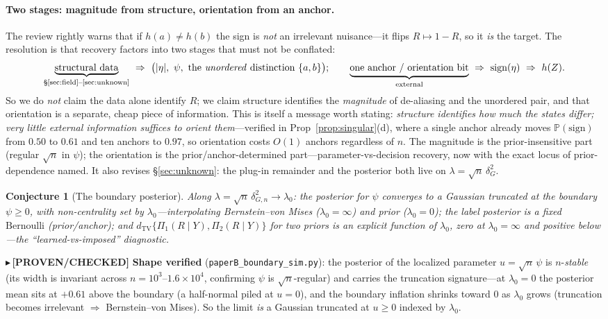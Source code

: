 \documentclass[11pt]{article}
\newtheorem{conjecture}{Conjecture}
\newcommand{\PROVEN}[1]{{\color{teal}\small$\blacktriangleright$\,\textbf{[PROVEN/CHECKED]} #1}}
\renewcommand{\Pr}{\mathbb{P}}\newcommand{\I}{\mathbb{I}}\newcommand{\HH}{\mathbb{H}}
\begin{document}
\paragraph{Two stages: magnitude from structure, orientation from an anchor.} The review rightly warns that if
$h(a)\neq h(b)$ the sign is \emph{not} an irrelevant nuisance---it flips $R\mapsto1-R$, so it \emph{is} the
target. The resolution is that recovery factors into two stages that must not be conflated:
\[
   \underbrace{\text{structural data}}_{\text{§\ref{sec:field}--\ref{sec:unknown}}}\ \Rightarrow\
   \big(|\eta|,\ \psi,\ \text{the \emph{unordered} distinction }\{a,b\}\big);\qquad
   \underbrace{\text{one anchor / orientation bit}}_{\text{external}}\ \Rightarrow\ \mathrm{sign}(\eta)\ \Rightarrow\ h(Z).
\]
So we do \emph{not} claim the data alone identify $R$; we claim structure identifies the \emph{magnitude} of
de-aliasing and the unordered pair, and that orientation is a separate, cheap piece of information. This is itself
a message worth stating: \emph{structure identifies how much the states differ; very little external information
suffices to orient them}---verified in Prop~\ref{prop:singular}(d), where a single anchor already moves
$\Pr(\text{sign})$ from $0.50$ to $0.61$ and ten anchors to $0.97$, so orientation costs $O(1)$ anchors regardless
of $n$. The magnitude is the prior-insensitive part (regular $\sqrt n$ in $\psi$); the orientation is the
prior/anchor-determined part---parameter-vs-decision recovery, now with the exact locus of prior-dependence named.
It also revises \S\ref{sec:unknown}: the plug-in remainder and the posterior both live on $\lambda=\sqrt n\,\delta_G^2$.
\begin{conjecture}[The boundary posterior]\label{conj:bayes}
Along $\lambda=\sqrt n\,\delta_{G,n}^2\to\lambda_0$: the posterior for $\psi$ converges to a Gaussian
\emph{truncated at the boundary} $\psi\ge0$, with non-centrality set by $\lambda_0$---interpolating
Bernstein--von Mises ($\lambda_0{=}\infty$) and prior ($\lambda_0{=}0$); the label posterior is a fixed
$\mathrm{Bernoulli}$ (prior/anchor); and $d_{\mathrm{TV}}\{\Pi_1(R\mid Y),\Pi_2(R\mid Y)\}$ for two priors is an
explicit function of $\lambda_0$, zero at $\lambda_0{=}\infty$ and positive below---the ``learned-vs-imposed''
diagnostic.
\end{conjecture}
\PROVEN{\textbf{Shape verified} (\texttt{paperB\_boundary\_sim.py}): the posterior of the localized parameter
$u=\sqrt n\,\psi$ is $n$-\emph{stable} (its width is invariant across $n{=}10^3$--$1.6{\times}10^4$, confirming
$\psi$ is $\sqrt n$-regular) and carries the truncation signature---at $\lambda_0{=}0$ the posterior mean sits at
$+0.61$ above the boundary (a half-normal piled at $u{=}0$), and the boundary inflation shrinks toward $0$ as
$\lambda_0$ grows (truncation becomes irrelevant $\Rightarrow$ Bernstein--von Mises). So the limit \emph{is} a
Gaussian truncated at $u\ge0$ indexed by $\lambda_0$.}
\end{document}

